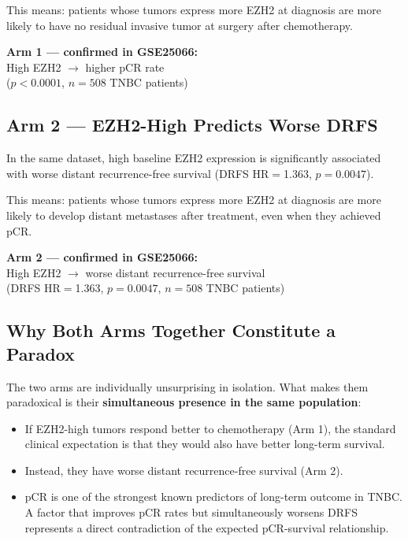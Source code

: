 \documentclass[12pt, a4paper]{article}
\begin{document}
This means: patients whose tumors express more EZH2
at diagnosis are more likely to have no residual
invasive tumor at surgery after chemotherapy.

\begin{center}
\colorbox{findingbox}{
\begin{minipage}{0.82\textwidth}
\vspace{0.4em}
\textbf{Arm 1 — confirmed in GSE25066:}\\
High EZH2 $\rightarrow$ higher pCR rate\\
($p < 0.0001$, $n = 508$ TNBC patients)
\vspace{0.4em}
\end{minipage}}
\end{center}

\subsection{Arm 2 — EZH2-High Predicts Worse DRFS}

In the same dataset, high baseline EZH2 expression
is significantly associated with worse distant
recurrence-free survival (DRFS HR$=$1.363,
$p = 0.0047$).

This means: patients whose tumors express more EZH2
at diagnosis are more likely to develop distant
metastases after treatment, even when they achieved
pCR.

\begin{center}
\colorbox{warnbox}{
\begin{minipage}{0.82\textwidth}
\vspace{0.4em}
\textbf{Arm 2 — confirmed in GSE25066:}\\
High EZH2 $\rightarrow$ worse distant
recurrence-free survival\\
(DRFS HR$=$1.363, $p = 0.0047$,
$n = 508$ TNBC patients)
\vspace{0.4em}
\end{minipage}}
\end{center}

\subsection{Why Both Arms Together Constitute a Paradox}

The two arms are individually unsurprising in isolation.
What makes them paradoxical is their
\textbf{simultaneous presence in the same population}:

\begin{itemize}
    \item If EZH2-high tumors respond better to
    chemotherapy (Arm 1), the standard clinical
    expectation is that they would also have better
    long-term survival.
    \item Instead, they have worse distant
    recurrence-free survival (Arm 2).
    \item pCR is one of the strongest known predictors
    of long-term outcome in TNBC. A factor that
    improves pCR rates but simultaneously worsens
    DRFS represents a direct contradiction of the
    expected pCR-survival relationship.
\end{itemize}
\end{document}

